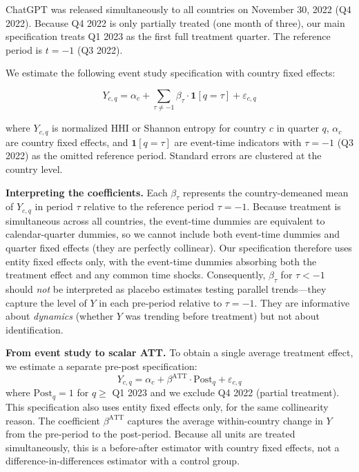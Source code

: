\documentclass[12pt]{article}
\begin{document}
ChatGPT was released simultaneously to all countries on November 30, 2022 (Q4 2022). Because Q4 2022 is only partially treated (one month of three), our main specification treats Q1 2023 as the first full treatment quarter. The reference period is $t = -1$ (Q3 2022).

We estimate the following event study specification with country fixed effects:

\begin{equation}
Y_{c,q} = \alpha_c + \sum_{\tau \neq -1} \beta_\tau \cdot \mathbf{1}[q = \tau] + \varepsilon_{c,q}
\label{eq:eventstudy}
\end{equation}

\noindent where $Y_{c,q}$ is normalized HHI or Shannon entropy for country $c$ in quarter $q$, $\alpha_c$ are country fixed effects, and $\mathbf{1}[q = \tau]$ are event-time indicators with $\tau = -1$ (Q3 2022) as the omitted reference period. Standard errors are clustered at the country level.

\textbf{Interpreting the coefficients.} Each $\beta_\tau$ represents the country-demeaned mean of $Y_{c,q}$ in period $\tau$ relative to the reference period $\tau = -1$. Because treatment is simultaneous across all countries, the event-time dummies are equivalent to calendar-quarter dummies, so we cannot include both event-time dummies and quarter fixed effects (they are perfectly collinear). Our specification therefore uses entity fixed effects only, with the event-time dummies absorbing both the treatment effect and any common time shocks. Consequently, $\beta_\tau$ for $\tau < -1$ should \textit{not} be interpreted as placebo estimates testing parallel trends---they capture the level of $Y$ in each pre-period relative to $\tau = -1$. They are informative about \textit{dynamics} (whether $Y$ was trending before treatment) but not about identification.

\textbf{From event study to scalar ATT.} To obtain a single average treatment effect, we estimate a separate pre-post specification:
\begin{equation}
Y_{c,q} = \alpha_c + \beta^{\text{ATT}} \cdot \text{Post}_q + \varepsilon_{c,q}
\label{eq:att}
\end{equation}
where $\text{Post}_q = 1$ for $q \geq$ Q1 2023 and we exclude Q4 2022 (partial treatment). This specification also uses entity fixed effects only, for the same collinearity reason. The coefficient $\beta^{\text{ATT}}$ captures the average within-country change in $Y$ from the pre-period to the post-period. Because all units are treated simultaneously, this is a before-after estimator with country fixed effects, not a difference-in-differences estimator with a control group.
\end{document}
